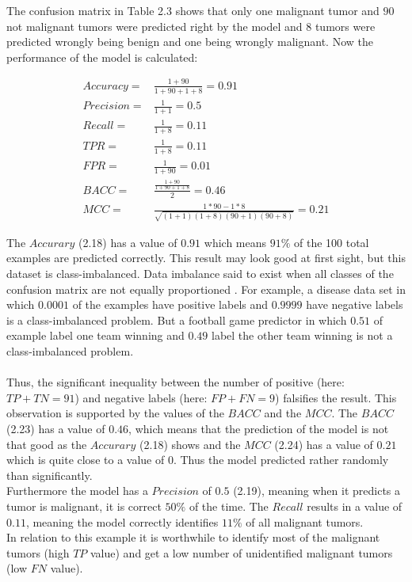 \begin{exmp}
The confusion matrix in Table 2.3 shows that only one malignant tumor and $90$ not malignant tumors were predicted right by the model and $8$ tumors were predicted wrongly being benign and one being wrongly malignant. Now the performance of the model is calculated:

\begin{align}
Accuracy   = & \frac{1+90}{1+90+1+8}  = 0.91\\
Precision  = & \frac{1}{1+1}  = 0.5\\
Recall     = & \frac{1}{1+8}  = 0.11\\
TPR        = & \frac{1}{1+8} = 0.11 \\
FPR        = &  \frac{1}{1+90}  = 0.01  \\
BACC       = & \frac{\frac{1+90}{1+90+1+8}}{2} = 0.46  \\
MCC        = & \frac{1*90-1*8}{\sqrt{(1+1)(1+8)(90+1)(90+8)}}  = 0.21
\end{align}


The $Accurary$ (2.18) has a value of $0.91$ which means $91\%$ of the 100 total examples are predicted correctly. This result may look good at first sight, but this dataset is class-imbalanced. Data imbalance said to exist when all classes of the confusion matrix are not equally proportioned \citep{Anand.2010}.
 For example, a disease data set in which $0.0001$ of the examples have positive labels and $0.9999$ have negative labels is a class-imbalanced problem. But a football game predictor in which $0.51$ of example label one team winning and $0.49$ label the other team winning is not a class-imbalanced problem.
\\\\
Thus, the significant inequality between the number of positive (here: $TP+TN=91$) and negative labels (here: $FP+FN=9$) falsifies the result. This observation is supported by the values of the $BACC$ and the $MCC$. The $BACC$ (2.23) has a value of $0.46$, which means that the prediction of the model is not that good as the $Accurary$ (2.18) shows and the $MCC$ (2.24) has a value of $0.21$ which is quite close to a value of $0$. Thus the model predicted rather randomly than significantly.\\
Furthermore the model has a $Precision$ of $0.5$ (2.19), meaning when it predicts a tumor is malignant, it is correct $50\% $ of the time. The $Recall$ results in a value of $0.11$, meaning the model correctly identifies $11\%$ of all malignant tumors.\\
In relation to this example it is worthwhile to identify most of the malignant tumors (high $TP$ value) and get a low number of unidentified malignant tumors (low $FN$ value). 
\end{exmp}






